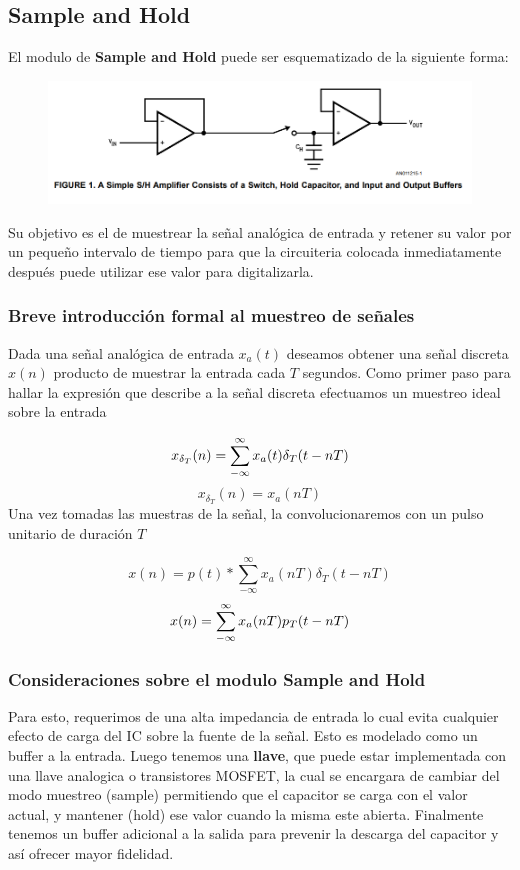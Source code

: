 


\subsection{Sample and Hold}

El modulo de \textbf{Sample and Hold}  puede ser esquematizado de la siguiente forma:

\begin{figure}[H]
	\centering
	\includegraphics[width=0.7\linewidth]{ImagenesEjercicio4/SyH}
	\caption{}
	\label{fig:syh}
\end{figure}
Su objetivo es el de muestrear la señal analógica de entrada y retener su valor por un pequeño intervalo de tiempo para que la circuiteria colocada inmediatamente después puede utilizar ese valor para digitalizarla.
\subsubsection{Breve introducción formal al muestreo de señales}
Dada una señal analógica de entrada $x_{a}(t)$ deseamos obtener una señal discreta $x(n)$ producto de muestrar la entrada cada $T$ segundos.
Como primer paso para hallar la expresión que describe a la señal discreta efectuamos un muestreo ideal sobre la entrada

\begin{equation}
	\centering
	x_{\delta_{T}}(n)=\sum_{-\infty}^{\infty} x_{a}(t)\delta_{T}(t-nT)
	\label{
		muestreo_ideal}
\end{equation}
$$x_{\delta_{T}}(n) =x_{a}(nT) $$
Una vez tomadas las muestras de la señal, la convolucionaremos con un pulso unitario de duración $T$

$$x(n)=p(t)*\sum_{-\infty}^{\infty} x_{a}(nT)\delta_{T}(t-nT)$$
\begin{equation}
\centering
x(n)=\sum_{-\infty}^{\infty} x_{a}(nT)p_{T}(t-nT)
\end{equation}

\subsubsection{Consideraciones sobre el modulo Sample and Hold}
Para esto, requerimos de una alta impedancia de entrada lo cual evita cualquier efecto de carga del IC sobre la fuente de la señal. Esto es modelado como un buffer a la entrada. Luego tenemos una \textbf{llave}, que puede estar implementada con una llave analogica o transistores MOSFET, la cual se encargara de cambiar del modo muestreo (sample) permitiendo que el capacitor se carga con el valor actual, y mantener (hold) ese valor cuando la misma este abierta. Finalmente tenemos un buffer adicional a la salida para prevenir la descarga del capacitor y así ofrecer mayor fidelidad. 


